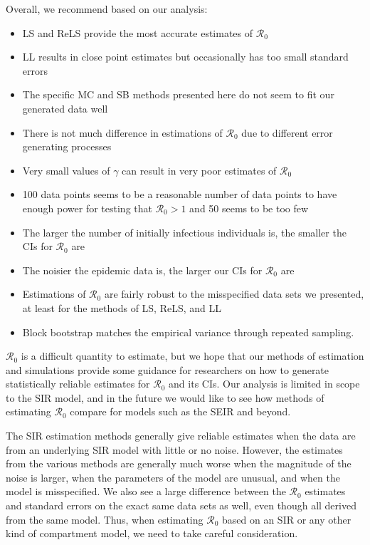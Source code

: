 \documentclass[12pt]{article}
\newcommand{\rr}{\ensuremath{\mathcal{R}_0}}
\begin{document}
Overall, we recommend based on our analysis:
\begin{itemize}
  \item LS and ReLS provide the most accurate estimates of $\rr$
  \item LL results in close point estimates but occasionally has too small standard errors
  \item The specific MC and SB methods presented here do not seem to fit our generated data well
  \item There is not much difference in estimations of $\rr$ due to different error generating processes
  \item Very small values of $\gamma$ can result in very poor estimates of $\rr$
  \item 100 data points seems to be a reasonable number of data points to have enough power for testing that $\rr > 1$ and 50 seems to be too few
  \item The larger the number of initially infectious individuals is, the smaller the CIs for $\rr$ are
  \item The noisier the epidemic data is, the larger our CIs for $\rr$ are
  \item Estimations of $\rr$ are fairly robust to the misspecified data sets we presented, at least for the methods of LS, ReLS, and LL
  \item Block bootstrap matches the empirical variance through repeated sampling.
  \end{itemize}

$\rr$ is a difficult quantity to estimate, but we hope that our methods of estimation and simulations provide some guidance for researchers on how to generate statistically reliable estimates for $\rr$ and its CIs.  Our analysis is limited in scope to the SIR model, and in the future we would like to see how methods of estimating $\rr$ compare for models such as the SEIR and beyond.






The SIR estimation methods generally give reliable estimates when the data are from an underlying SIR model with little or no noise. However, the estimates from the various methods are generally much worse when the magnitude of the noise is larger, when the parameters of the model are unusual, and when the model is misspecified. We also see a large difference between the $\rr$ estimates and standard errors on the exact same data sets as well, even though all derived from the same model. Thus, when estimating $\rr$ based on an SIR or any other kind of compartment model, we need to take careful consideration.
\end{document}
